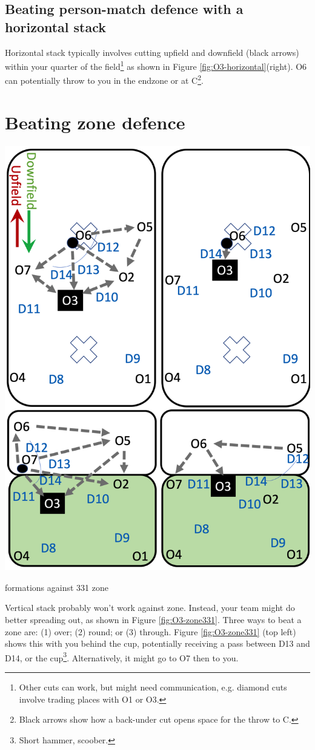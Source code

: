 \documentclass{tufte-handout}
\begin{document}
\subsection{Beating person-match defence with a horizontal stack}\label{sec:horizontall}
Horizontal stack 
typically involves cutting
upfield and downfield (black arrows)
within your quarter of the field\footnote{
Other cuts
can work, 
but might need
communication,
e.g. diamond cuts 
involve trading places 
with O1 
or O3.}
as shown in 
Figure \ref{fig:O3-horizontal}(right).
O6 
can potentially 
throw to you 
in the endzone 
or at C\footnote{
Black arrows
show how a back-under cut 
opens space 
for the throw 
to C.}. 

\section{Beating zone defence}\label{sec:zone}
\begin{marginfigure}%
  \includegraphics[width=\linewidth]{O3-zone331}
  \caption{formations against 331 zone}
  \label{fig:O3-zone331}
\end{marginfigure}
Vertical stack 
probably won't work
against zone. 
Instead, your 
team might do better spreading out, 
as shown 
in Figure \ref{fig:O3-zone331}. 
Three ways to beat a zone are:
(1) over;
(2) round; or
(3) through. 
Figure \ref{fig:O3-zone331}
(top left)
shows this 
with you 
behind the cup, 
potentially receiving a pass 
between 
D13 
and D14, or 
the cup\footnote{
Short hammer, scoober.}.
Alternatively, 
it might go 
to O7 then 
 to you.
\end{document}
